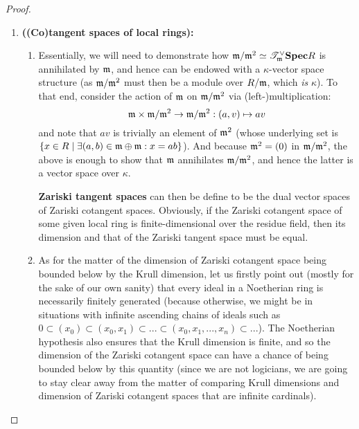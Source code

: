                 \begin{proof}
                    \noindent
                    \begin{enumerate}
                        \item \textbf{\textbf{((Co)tangent spaces of local rings):}} 
                            \begin{enumerate}
                                \item Essentially, we will need to demonstrate how $\mathfrak{m}/\mathfrak{m}^2 \simeq \mathscr{T}^{\vee}_{\mathfrak{m}}\mathbf{Spec} R$ is annihilated by $\mathfrak{m}$, and hence can be endowed with a $\kappa$-vector space structure (as $\mathfrak{m}/\mathfrak{m}^2$ must then be a module over $R/\mathfrak{m}$, which \textit{is} $\kappa$). To that end, consider the action of $\mathfrak{m}$ on $\mathfrak{m}/\mathfrak{m}^2$ via (left-)multiplication:
                                    $$\m \x \m/\m^2 \to \m/\m^2: (a, v) \mapsto av$$
                                and note that $av$ is trivially an element of $\mathfrak{m}^2$ (whose underlying set is $\{x \in R \mid \exists (a, b) \in \mathfrak{m} \oplus \mathfrak{m}: x = ab\}$). And because $\mathfrak{m}^2 = (0)$ in $\mathfrak{m}/\mathfrak{m}^2$, the above is enough to show that $\mathfrak{m}$ annihilates $\mathfrak{m}/\mathfrak{m}^2$, and hence the latter is a vector space over $\kappa$. 
                                
                                \textbf{Zariski tangent spaces} can then be define to be the dual vector spaces of Zariski cotangent spaces. Obviously, if the Zariski cotangent space of some given local ring is finite-dimensional over the residue field, then its dimension and that of the Zariski tangent space must be equal.
                                
                                \item As for the matter of the dimension of Zariski cotangent space being bounded below by the Krull dimension, let us firstly point out (mostly for the sake of our own sanity) that every ideal in a Noetherian ring is necessarily finitely generated (because otherwise, we might be in situations with infinite ascending chains of ideals such as $0 \subset (x_0) \subset (x_0, x_1) \subset ... \subset (x_0, x_1, ..., x_n) \subset ...$). The Noetherian hypothesis also ensures that the Krull dimension is finite, and so the dimension of the Zariski cotangent space can have a chance of being bounded below by this quantity (since we are not logicians, we are going to stay clear away from the matter of comparing Krull dimensions and dimension of Zariski cotangent spaces that are infinite cardinals).
                                

\end{enumerate}
\end{enumerate}
\end{proof}
